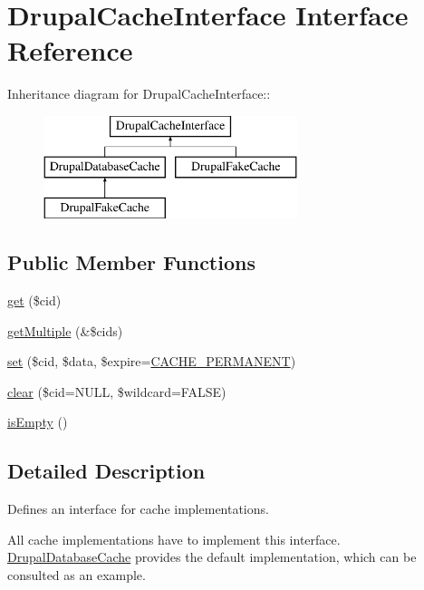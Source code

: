 \hypertarget{interfaceDrupalCacheInterface}{
\section{DrupalCacheInterface Interface Reference}
\label{interfaceDrupalCacheInterface}
}
Inheritance diagram for DrupalCacheInterface::\begin{figure}[H]
\begin{center}
\leavevmode
\includegraphics[height=3cm]{interfaceDrupalCacheInterface}
\end{center}
\end{figure}
\subsection*{Public Member Functions}
\begin{DoxyCompactItemize}
\item 
\hyperlink{interfaceDrupalCacheInterface_ad5e2988b3cb4633f473ebf0f889d088f}{get} (\$cid)
\item 
\hyperlink{interfaceDrupalCacheInterface_aee8c869921fff61654d12099237763dc}{getMultiple} (\&\$cids)
\item 
\hyperlink{interfaceDrupalCacheInterface_ab9bbd1913d6747a74585f36b9282594c}{set} (\$cid, \$data, \$expire=\hyperlink{bootstrap_8inc_ad987330fff5fa7c75800762ddedf300c}{CACHE\_\-PERMANENT})
\item 
\hyperlink{interfaceDrupalCacheInterface_a5c8e341f653337185feff4ddc30c1b48}{clear} (\$cid=NULL, \$wildcard=FALSE)
\item 
\hyperlink{interfaceDrupalCacheInterface_a54fa3e2f8e11cbb551d5168c9f22c720}{isEmpty} ()
\end{DoxyCompactItemize}


\subsection{Detailed Description}
Defines an interface for cache implementations.

All cache implementations have to implement this interface. \hyperlink{classDrupalDatabaseCache}{DrupalDatabaseCache} provides the default implementation, which can be consulted as an example.

